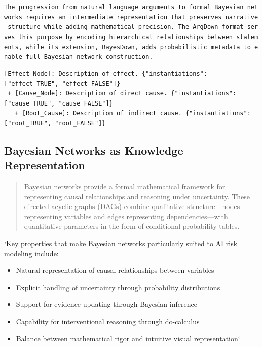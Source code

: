 \documentclass[
  11pt,
  letterpaper,
]{book}
\providecommand{\tightlist}{%
  \setlength{\itemsep}{0pt}\setlength{\parskip}{0pt}}
\begin{document}
\texttt{The\ progression\ from\ natural\ language\ arguments\ to\ formal\ Bayesian\ networks\ requires\ an\ intermediate\ representation\ that\ preserves\ narrative\ structure\ while\ adding\ mathematical\ precision.\ The\ ArgDown\ format\ serves\ this\ purpose\ by\ encoding\ hierarchical\ relationships\ between\ statements,\ while\ its\ extension,\ BayesDown,\ adds\ probabilistic\ metadata\ to\ enable\ full\ Bayesian\ network\ construction.}

\begin{verbatim}
[Effect_Node]: Description of effect. {"instantiations": ["effect_TRUE", "effect_FALSE"]}
 + [Cause_Node]: Description of direct cause. {"instantiations": ["cause_TRUE", "cause_FALSE"]}
   + [Root_Cause]: Description of indirect cause. {"instantiations": ["root_TRUE", "root_FALSE"]}
\end{verbatim}

\subsection{Bayesian Networks as Knowledge
Representation}\label{sec-bayesian-networks}

\begin{quote}
Bayesian networks provide a formal mathematical framework for
representing causal relationships and reasoning under uncertainty. These
directed acyclic graphs (DAGs) combine qualitative structure---nodes
representing variables and edges representing dependencies---with
quantitative parameters in the form of conditional probability tables.
\end{quote}

`Key properties that make Bayesian networks particularly suited to AI
risk modeling include:

\begin{itemize}
\tightlist
\item
  Natural representation of causal relationships between variables
\item
  Explicit handling of uncertainty through probability distributions
\item
  Support for evidence updating through Bayesian inference
\item
  Capability for interventional reasoning through do-calculus
\item
  Balance between mathematical rigor and intuitive visual
  representation`
\end{itemize}
\end{document}
